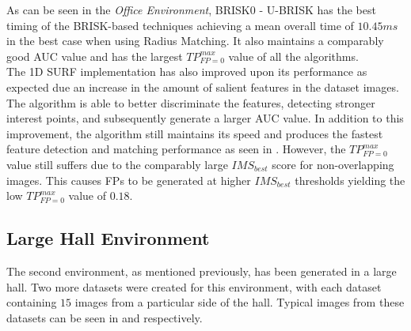\documentclass[11pt]{report}
\begin{document}
As can be seen in the \textit{Office Environment}, BRISK0 - U-BRISK has the best timing of the BRISK-based techniques achieving a mean overall time of $10.45 ms$ in the best case when using Radius Matching. It also maintains a comparably good AUC value and has the largest $TP_{FP=0}^{max}$ value of all the algorithms.\\  

The 1D SURF implementation has also improved upon its performance as expected due an increase in the amount of salient features in the dataset images. The algorithm is able to better discriminate the features, detecting stronger interest points, and subsequently generate a larger AUC value. In addition to this improvement, the algorithm still maintains its speed and produces the fastest feature detection and matching performance as seen in . However, the $TP_{FP=0}^{max}$ value still suffers due to the comparably large $IMS_{best}$ score for non-overlapping images. This causes FPs to be generated at higher $IMS_{best}$ thresholds yielding the low $TP_{FP=0}^{max}$ value of $0.18$. \\


\subsection{Large Hall Environment}
\label{sec:largeHall}
The second environment, as mentioned previously, has been generated in a large hall. Two more datasets were created for this environment, with each dataset containing $15$ images from a particular side of the hall. Typical images from these datasets can be seen in  and  respectively.\\ 
\end{document}
